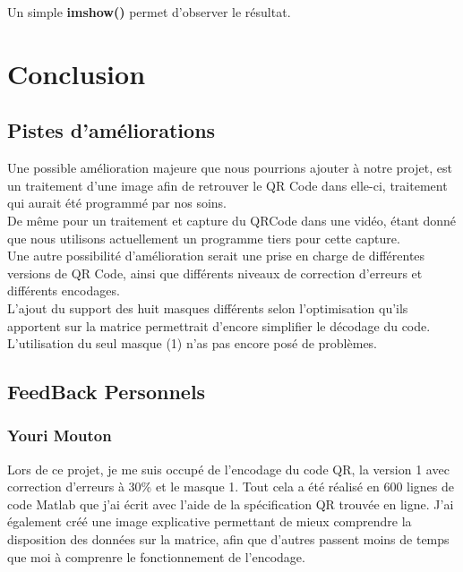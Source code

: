\documentclass{report}
\begin{document}
			Un simple \textbf{imshow()} permet d'observer le résultat.\\

\chapter{Conclusion}

	\section{Pistes d'améliorations}

		Une possible amélioration majeure que nous pourrions ajouter à notre projet, est un traitement d'une image afin de retrouver le QR Code dans elle-ci, traitement qui aurait été programmé par nos soins.\\
		De même pour un traitement et capture du QRCode dans une vidéo, étant donné que nous utilisons actuellement un programme tiers pour cette capture.\\

		Une autre possibilité d'amélioration serait une prise en charge de différentes versions de QR Code, ainsi que différents niveaux de correction d'erreurs et différents encodages.\\
		
		L'ajout du support des huit masques différents selon l'optimisation qu'ils apportent sur la matrice permettrait d'encore simplifier le décodage du code. L'utilisation du seul masque (1) n'as pas encore posé de problèmes.

	\section{FeedBack Personnels}

		\subsection{Youri Mouton}
		
		    Lors de ce projet, je me suis occupé de l'encodage du code QR, la version 1 avec correction d'erreurs à 30\% et le masque 1. Tout cela  a été réalisé en 600 lignes de code Matlab que j'ai écrit avec l'aide de la spécification QR trouvée en ligne. J'ai également créé une image explicative permettant de mieux comprendre la disposition des données sur la matrice, afin que d'autres passent moins de temps que moi à comprenre le fonctionnement de l'encodage.\\
		    
\end{document}
